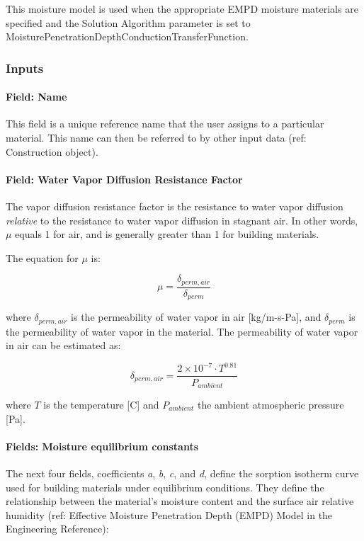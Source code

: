 This moisture model is used when the appropriate EMPD moisture materials are specified and the Solution Algorithm parameter is set to MoisturePenetrationDepthConductionTransferFunction.

\subsubsection{Inputs}\label{empd-inputs}

\paragraph{Field: Name}\label{materialpropertymoisturepenetrationdepthsettings-field-name}

This field is a unique reference name that the user assigns to a particular material. This name can then be referred to by other input data (ref: Construction object).

\paragraph{Field: Water Vapor Diffusion Resistance Factor}\label{field-water-vapor-diffusion-resistance-factor}

The vapor diffusion resistance factor is the resistance to water vapor diffusion \emph{relative} to the resistance to water vapor diffusion in stagnant air. In other words, \(\mu\) equals 1 for air, and is generally greater than 1 for building materials.

The equation for \(\mu\) is:

\[ \mu = \frac {\delta_{perm,air}} {\delta_{perm}} \]

where \(\delta_{perm,air}\) is the permeability of water vapor in air {[}kg/m-s-Pa{]}, and \(\delta_{perm}\) is the permeability of water vapor in the material. The permeability of water vapor in air can be estimated as:

\[ \delta_{perm,air} = \frac {2 \times 10^{-7} \cdot T^{0.81}} {P_{ambient}} \]

where \(T\) is the temperature {[}C{]} and \(P_{ambient}\) the ambient atmospheric pressure {[}Pa{]}.

\paragraph{Fields: Moisture equilibrium constants}\label{fields-moisture-equilibrium-constants}

The next four fields, coefficients \emph{a}, \emph{b}, \emph{c}, and \emph{d}, define the sorption isotherm curve used for building materials under equilibrium conditions. They define the relationship between the material's moisture content and the surface air relative humidity (ref: Effective Moisture Penetration Depth (EMPD) Model in the Engineering Reference):

